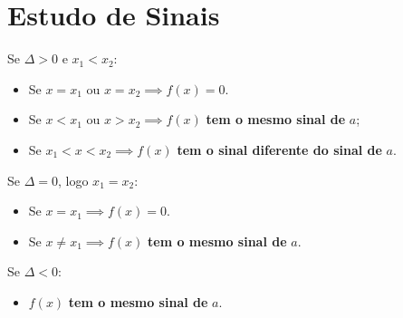 \documentclass[12pt,a4paper]{report}
\begin{document}
\section{Estudo de Sinais}
	\begin{destaque}
	Se $\Delta>0$ e $x_1<x_2$:
	\begin{itemize}
		\item Se $x=x_1$ ou $x=x_2 \implies f(x) = 0$.
		\item Se $x<x_1$ ou $x>x_2 \implies f(x)$ \textbf{tem o mesmo sinal de} $a$;
		\item Se $x_1<x<x_2 \implies f(x)$ \textbf{tem o sinal diferente do sinal de} $a$. 
	\end{itemize}
	
	Se $\Delta=0$, logo $x_1=x_2$:
	\begin{itemize}
		\item Se $x=x_1 \implies f(x) = 0$.
		\item Se $x \neq x_1 \implies f(x)$ \textbf{tem o mesmo sinal de} $a$. 
	\end{itemize}
	
	Se $\Delta<0$:
	\begin{itemize}
		\item $f(x)$ \textbf{tem o mesmo sinal de} $a$.
	\end{itemize}
	
\end{destaque}
\end{document}
